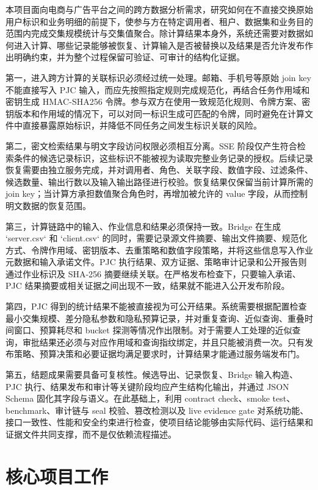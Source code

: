 \documentclass[UTF8,a4paper,12pt,oneside]{ctexrep}
\begin{document}
本项目面向电商与广告平台之间的跨方数据分析需求，研究如何在不直接交换原始用户标识和业务明细的前提下，使参与方在特定调用者、租户、数据集和业务目的范围内完成交集规模统计与交集值聚合。除计算结果本身外，系统还需要对数据如何进入计算、哪些记录能够被恢复、计算输入是否被替换以及结果是否允许发布作出明确约束，并为整个过程保留可验证、可审计的结构化证据。

第一，进入跨方计算的关联标识必须经过统一处理。邮箱、手机号等原始 join key 不能直接写入 PJC 输入，而应先按照指定规则完成规范化，再结合任务作用域和密钥生成 HMAC-SHA256 令牌。参与双方在使用一致规范化规则、令牌方案、密钥版本和作用域的情况下，可以对同一标识生成可匹配的令牌，同时避免在计算文件中直接暴露原始标识，并降低不同任务之间发生标识关联的风险。

第二，密文检索结果与明文字段访问权限必须相互分离。SSE 阶段仅产生符合检索条件的候选记录标识，这些标识不能被视为读取完整业务记录的授权。后续记录恢复需要由独立服务完成，并对调用者、角色、关联字段、数值字段、过滤条件、候选数量、输出行数以及输入输出路径进行校验。恢复结果仅保留当前计算所需的 join key；当计算方承担数值聚合角色时，再增加被允许的 value 字段，从而控制明文数据的恢复范围。

第三，计算链路中的输入、作业信息和结果必须保持一致。Bridge 在生成 `server.csv` 和 `client.csv` 的同时，需要记录源文件摘要、输出文件摘要、规范化方式、令牌作用域、密钥版本、去重策略和数值字段策略，并将这些信息写入作业元数据和输入承诺文件。PJC 执行结果、双方证据、策略审计记录和公开报告则通过作业标识及 SHA-256 摘要继续关联。在严格发布检查下，只要输入承诺、PJC 结果摘要或相关证据之间出现不一致，结果就不能进入公开发布阶段。

第四，PJC 得到的统计结果不能被直接视为可公开结果。系统需要根据配置检查最小交集规模、差分隐私参数和隐私预算记录，并对重复查询、近似查询、重叠时间窗口、预算耗尽和 bucket 探测等情况作出限制。对于需要人工处理的近似查询，审批结果还必须与对应作用域和查询指纹绑定，并且只能被消费一次。只有发布策略、预算决策和必要证据均满足要求时，计算结果才能通过服务端发布门。

第五，结题成果需要具备可复核性。候选导出、记录恢复、Bridge 输入构造、PJC 执行、结果发布和审计等关键阶段均应产生结构化输出，并通过 JSON Schema 固化其字段与语义。在此基础上，利用 contract check、smoke test、benchmark、审计链与 seal 校验、篡改检测以及 live evidence gate 对系统功能、接口一致性、性能和安全约束进行检查，使项目结论能够由实际代码、运行结果和证据文件共同支撑，而不是仅依赖流程描述。


\section{核心项目工作}
\end{document}
